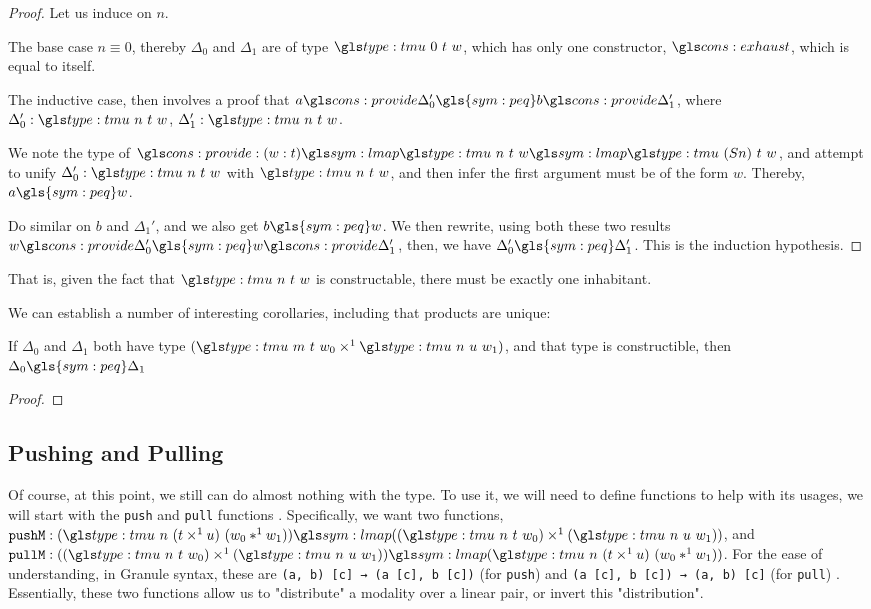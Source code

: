 \begin{proof}
	Let us induce on $n$.
	
	The base case $n \equiv 0$, thereby $\Delta_0$ and $\Delta_1$ are of type $\tmu \ 0 \ t \ w$, which has only one constructor, $\mz$, which is equal to itself.
	
	The inductive case, then involves a proof that $a \nsum \Delta_0' \gls{sym:peq} b \nsum \Delta_1'$, where $\Delta_0' : \tmu \ n \ t \ w$, $\Delta_1' : \tmu \ n \ t \ w$.
	
	We note the type of $\nsum : (w : t) \proc \tmu \ n \ t \ w \proc \tmu \ (S n) \ t \ w$, and attempt to unify $\Delta_0' : \tmu \ n \ t \ w$ with $\tmu \ n \ t \ w$, and then infer the first argument must be of the form $w$.
	Thereby, $a \gls{sym:peq} w$.
	
	Do similar on $b$ and $\Delta_1'$, and we also get $b \gls{sym:peq} w$. 
	We then rewrite, using both these two results $w \nsum \Delta_0' \gls{sym:peq} w \nsum \Delta_1'$, then, we have $\Delta_0' \gls{sym:peq} \Delta_1'$.
	This is the induction hypothesis.
\end{proof}

That is, given the fact that $ \tmu \ n \ t \ w$ is constructable, there must be exactly one inhabitant.

We can establish a number of interesting corollaries, including that products are unique:

\begin{corollary}
	If $\Delta_0$ and $\Delta_1$ both have type $(\tmu \ m \ t \ w_0 \lpair \tmu \ n \ u \ w_1)$, and that type is constructible, then $\Delta_0 \gls{sym:peq} \Delta_1$
\end{corollary}

\begin{proof}
\end{proof}

\subsection{Pushing and Pulling}

\label{sec:push_pull}


Of course, at this point, we still can do almost nothing with the \tmu type.
To use it, we will need to define functions to help with its usages, we will start with the \verb|push| and \verb|pull| functions \cite{quant_graded_modal}.
Specifically, we want two functions, $\verb|pushM| : ( \tmu \ n \ (t \lpair u) \ (w_0 \ltup w_1)) \proc (( \tmu \ n \ t \ w_0) \lpair ( \tmu \ n \ u \ w_1))$, and $\verb|pullM| : (( \tmu \ n \ t \ w_0) \lpair ( \tmu \ n \ u \ w_1)) \proc ( \tmu \ n \ (t \lpair u) \ (w_0 \ltup w_1))$.
For the ease of understanding, in Granule syntax, these are \verb|(a, b) [c] → (a [c], b [c])| (for \verb|push|) and \verb|(a [c], b [c]) → (a, b) [c]| (for \verb|pull|) \cite{quant_graded_modal}.
Essentially, these two functions allow us to "distribute" a modality over a linear pair, or invert this "distribution". 

